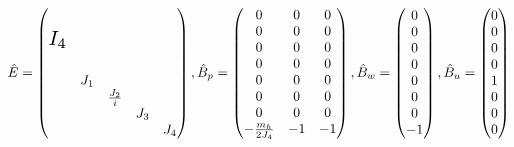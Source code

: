 \begin{equation}
\hat E =\pmatr{
\multirow{4}{*}{\scalebox{1.5}{$I_4$}} &   &             &   &   \\
                                       &   &             &   &   \\
                                       &   &             &   &   \\
                                       &   &             &   &   \\                                                        
                                       &J_1&             &   &   \\
                                       &   &\frac{J_2}{i}&   &   \\
                                       &   &             &J_3&   \\
                                       &   &             &   &J_4
},
\hat B_p = 
\pmatr{
0   &0   &0   \\
0   &0   &0   \\
0   &0   &0   \\
0   &0   &0   \\
0   &0   &0   \\
0   &0   &0   \\
0   &0   &0   \\
-\frac{m_h}{2J_4}   &-1   &-1
},
\hat B_w = 
\pmatr{0\\0\\0\\0\\0\\0\\0\\-1},
\hat B_u = \pmatr{0\\0\\0\\0\\1\\0\\0\\0}
\label{eq:eqrotmodelE}
\end{equation}


